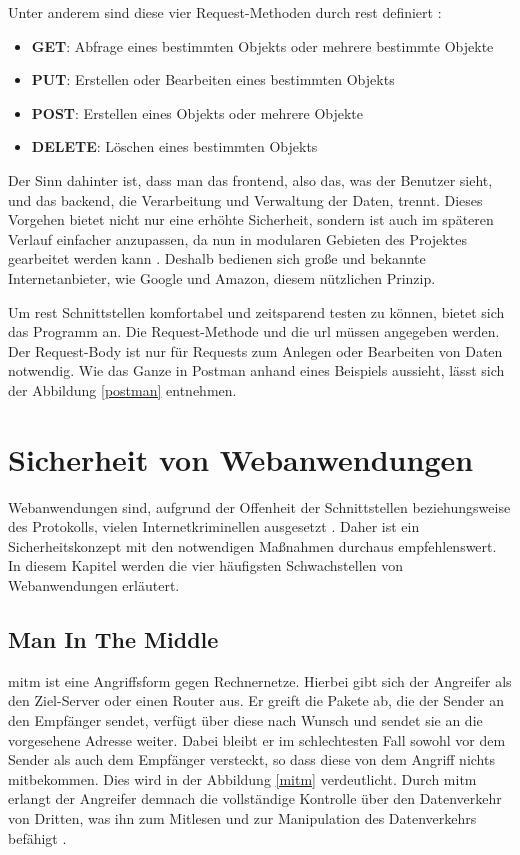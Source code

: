 Unter anderem sind diese vier Request-Methoden durch \gls{rest} definiert \cite[S.~260f]{client-server-book}:
\begin{itemize}
	\item \textbf{GET}: Abfrage eines bestimmten Objekts oder mehrere bestimmte Objekte
	\item \textbf{PUT}: Erstellen oder Bearbeiten eines bestimmten Objekts
	\item \textbf{POST}: Erstellen eines Objekts oder mehrere Objekte
	\item \textbf{DELETE}: Löschen eines bestimmten Objekts
\end{itemize}

Der Sinn dahinter ist, dass man das \gls{frontend}, also das, was der Benutzer sieht, und das \gls{backend}, die Verarbeitung und Verwaltung der Daten, trennt. Dieses Vorgehen bietet nicht nur eine erhöhte Sicherheit, sondern ist auch im späteren Verlauf einfacher anzupassen, da nun in modularen Gebieten des Projektes gearbeitet werden kann \cite[S.~260]{client-server-book}. Deshalb bedienen sich große und bekannte Internetanbieter, wie Google und Amazon, diesem nützlichen Prinzip.

Um \gls{rest} Schnittstellen komfortabel und zeitsparend testen zu können, bietet sich das Programm  an.
Die Request-Methode und die \gls{url} müssen angegeben werden. Der Request-Body ist nur für Requests zum Anlegen oder Bearbeiten von Daten notwendig. Wie das Ganze in Postman anhand eines Beispiels aussieht, lässt sich der Abbildung \ref{postman} entnehmen.


\clearpage

\section{Sicherheit von Webanwendungen}
Webanwendungen sind, aufgrund der Offenheit der Schnittstellen beziehungsweise des Protokolls, vielen Internetkriminellen ausgesetzt \cite[S.~VI]{websecurity-book}. Daher ist ein Sicherheitskonzept mit den notwendigen Maßnahmen durchaus empfehlenswert. In diesem Kapitel werden die vier häufigsten Schwachstellen von Webanwendungen erläutert.

\subsection{Man In The Middle}
\gls{mitm} ist eine Angriffsform gegen Rechnernetze.
Hierbei gibt sich der Angreifer als den Ziel-Server oder einen Router aus.
Er greift die Pakete ab, die der Sender an den Empfänger sendet, verfügt über diese nach Wunsch und sendet sie an die vorgesehene Adresse weiter. Dabei bleibt er im schlechtesten Fall sowohl vor dem Sender als auch dem Empfänger versteckt, so dass diese von dem Angriff nichts mitbekommen. Dies wird in der Abbildung \ref{mitm} verdeutlicht.
Durch \gls{mitm} erlangt der Angreifer demnach die vollständige Kontrolle über den Datenverkehr von Dritten, was ihn zum Mitlesen und zur Manipulation des Datenverkehrs befähigt \cite[S.~9]{websecurity-book}.

